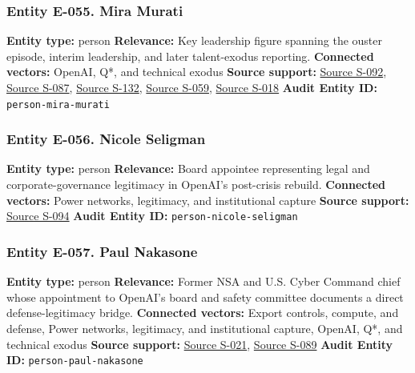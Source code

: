 \documentclass[
  american,
  11pt,
  letterpaper,
]{article}
\begin{document}
\subsubsection{Entity E-055. Mira
Murati}\label{entity-e-055-mira-murati}

\textbf{Entity type:} person \textbf{Relevance:} Key leadership figure
spanning the ouster episode, interim leadership, and later talent-exodus
reporting. \textbf{Connected vectors:} OpenAI, Q*, and technical exodus
\textbf{Source support:}
\hyperref[source-s-092-openai-announces-leadership-transition]{Source
S-092},
\hyperref[source-s-087-sam-altman-returns-as-ceo-openai-has-a-new-initial-board]{Source
S-087},
\hyperref[source-s-132-the-openai-talent-exodus-gives-rivals-an-opening]{Source
S-132},
\hyperref[source-s-059-who-s-left-at-openai-sam-altman-consolidates-power-after-failed-coup]{Source
S-059},
\hyperref[source-s-018-openai-chief-technology-officer-mira-murati-and-2-other-execs-are-leaving-the-chatgpt-maker]{Source
S-018} \textbf{Audit Entity ID:} \texttt{person-mira-murati}

\subsubsection{Entity E-056. Nicole
Seligman}\label{entity-e-056-nicole-seligman}

\textbf{Entity type:} person \textbf{Relevance:} Board appointee
representing legal and corporate-governance legitimacy in OpenAI's
post-crisis rebuild. \textbf{Connected vectors:} Power networks,
legitimacy, and institutional capture \textbf{Source support:}
\hyperref[source-s-094-openai-announces-new-members-to-board-of-directors]{Source
S-094} \textbf{Audit Entity ID:} \texttt{person-nicole-seligman}

\subsubsection{Entity E-057. Paul
Nakasone}\label{entity-e-057-paul-nakasone}

\textbf{Entity type:} person \textbf{Relevance:} Former NSA and U.S.
Cyber Command chief whose appointment to OpenAI's board and safety
committee documents a direct defense-legitimacy bridge.
\textbf{Connected vectors:} Export controls, compute, and defense, Power
networks, legitimacy, and institutional capture, OpenAI, Q*, and
technical exodus \textbf{Source support:}
\hyperref[source-s-021-openai-appoints-former-top-us-cyberwarrior-paul-nakasone-to-its-board-of-directors]{Source
S-021},
\hyperref[source-s-089-openai-board-forms-safety-and-security-committee]{Source
S-089} \textbf{Audit Entity ID:} \texttt{person-paul-nakasone}
\end{document}
